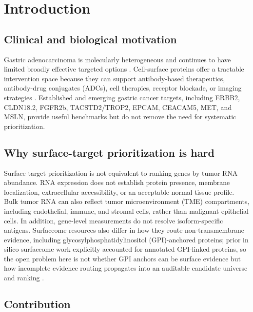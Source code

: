\documentclass[twocolumn]{article}
\begin{document}
\section{Introduction}

\subsection{Clinical and biological motivation}

Gastric adenocarcinoma is molecularly heterogeneous and continues to have limited broadly effective targeted options \cite{bray2024globocan,tcga2014gastric}. Cell-surface proteins offer a tractable intervention space because they can support antibody-based therapeutics, antibody-drug conjugates (ADCs), cell therapies, receptor blockade, or imaging strategies \cite{hu2021surfaceome,bauschfluck2015cspa,bauschfluck2018surfy,li2022pancancer,razzaghdoust2021adc,kathad2024adc}. Established and emerging gastric cancer targets, including ERBB2, CLDN18.2, FGFR2b, TACSTD2/\allowbreak{}TROP2, EPCAM, CEACAM5, MET, and MSLN, provide useful benchmarks but do not remove the need for systematic prioritization.

\subsection{Why surface-target prioritization is hard}

Surface-target prioritization is not equivalent to ranking genes by tumor RNA abundance. RNA expression does not establish protein presence, membrane localization, extracellular accessibility, or an acceptable normal-tissue profile. Bulk tumor RNA can also reflect tumor microenvironment (TME) compartments, including endothelial, immune, and stromal cells, rather than malignant epithelial cells. In addition, gene-level measurements do not resolve isoform-specific antigens. Surfaceome resources also differ in how they route non-transmembrane evidence, including glycosylphosphatidylinositol (GPI)-anchored proteins; prior in silico surfaceome work explicitly accounted for annotated GPI-linked proteins, so the open problem here is not whether GPI anchors can be surface evidence but how incomplete evidence routing propagates into an auditable candidate universe and ranking \cite{bauschfluck2018surfy}.

\subsection{Contribution}
\end{document}
